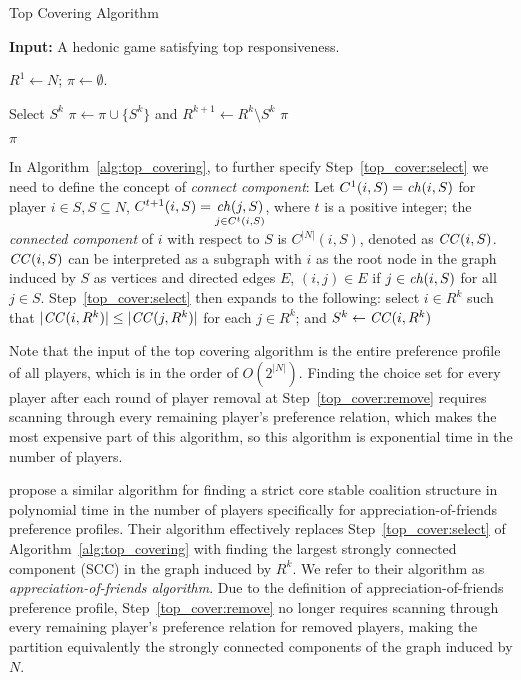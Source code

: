 \begin{algorithm}[htb]
  \caption{Top Covering Algorithm}
  \label{alg:top_covering}
  \textbf{Input:} A hedonic game satisfying top responsiveness.

  \begin{algorithmic}[1]
  \State $R^1 \leftarrow N$; $\pi \leftarrow \emptyset$.

    \State \label{top_cover:select} Select $S^k$
    \State \label{top_cover:remove} $\pi \leftarrow \pi \cup \lbrace S^k \rbrace$ and $R^{k+1} \leftarrow  R^k \setminus S^k$
      \State \Return $\pi$
    \EndIf
  \EndFor

  \State \Return $\pi$
 \end{algorithmic}
\end{algorithm}

In Algorithm~\ref{alg:top_covering}, to further specify Step~\ref{top_cover:select}
we need to define the concept of \textit{connect component}:
Let $C^1(i, S) = \mathit{ch}(i, S)$ for player $i \in S, S \subseteq N$,
$C^{t + 1}(i, S) = \underset{j \in C^t(i, S)}{\mathit{ch}(j, S)}$, where $t$ is a positive
integer; the \textit{connected component} of $i$ with respect to $S$ is 
$C^{|N|}(i, S)$, denoted as $\mathit{CC}(i, S)$. 
$\mathit{CC}(i, S)$ can be interpreted as a subgraph with $i$ as the root node in the graph
induced by $S$ as vertices and directed edges $E$,
$(i, j) \in E$ if $j \in \mathit{ch}(i, S)$ for all $j \in S$.
Step~\ref{top_cover:select} then expands to the following: select $i\in R^k$ such
that $|\mathit{CC}(i,R^k)| \leq |\mathit{CC}(j,R^k)|$ for each $j\in R^k$;
and $S^k\leftarrow \mathit{CC}(i,R^k)$

Note that the input of the top covering algorithm is the entire preference profile
of all players, which is in the order of $O(2^{|N|})$.
Finding the choice set for every player after each round of player removal at
Step~\ref{top_cover:remove} requires scanning through every remaining player's
preference relation, which makes the most expensive part of this algorithm,
so this algorithm is exponential time in the number of players.

 propose a similar algorithm for finding a strict core
stable coalition structure in polynomial time in the number of players
specifically for appreciation-of-friends preference profiles.
Their algorithm effectively replaces Step~\ref{top_cover:select} of
Algorithm~\ref{alg:top_covering} with finding the largest strongly connected
component (SCC) in the graph induced by $R^k$.
We refer to their algorithm as \textit{appreciation-of-friends algorithm}.
Due to the definition of appreciation-of-friends preference profile,
Step~\ref{top_cover:remove} no longer requires scanning through every remaining
player's preference relation for removed players, making the partition
equivalently the strongly connected components of the graph induced by $N$.


